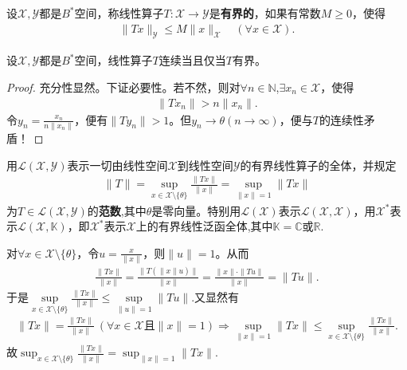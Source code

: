 \documentclass[../../main.tex]{subfiles}%
\begin{document}
\begin{definition}
设$\mathscr{X},\mathscr{Y}$都是$B^*$空间，称线性算子$T:\mathscr{X}\to\mathscr{Y}$是\textbf{有界的}，如果有常数$M\geqslant 0$，使得
\begin{align*}
\|Tx\|_{\mathscr{Y}}\leqslant M\|x\|_{\mathscr{X}}\quad (\forall x\in\mathscr{X}).
\end{align*}
\end{definition}

\begin{proposition}\label{proposition:线性算子有界当且仅当连续}
设$\mathscr{X},\mathscr{Y}$都是$B^*$空间，线性算子$T$连续当且仅当$T$有界。
\end{proposition}
\begin{proof}

充分性显然。下证必要性。若不然，则对$\forall n\in \mathbb{N}$,$\exists x_n\in\mathscr{X}$，使得
\begin{align*}
\|Tx_n\|>n\|x_n\|.
\end{align*}
令$y_n=\frac{x_n}{n\|x_n\|}$，便有$\|Ty_n\|>1$。但$y_n\to\theta(n\to\infty)$，便与$T$的连续性矛盾！

\end{proof}

\begin{definition}
用$\mathscr{L}(\mathscr{X},\mathscr{Y})$表示一切由线性空间$\mathscr{X}$到线性空间$\mathscr{Y}$的有界线性算子的全体，并规定
\begin{align*}
\|T\|=\sup_{x\in\mathscr{X}\setminus\{\theta\}}\frac{\|Tx\|}{\|x\|}=\sup_{\|x\|=1}\|Tx\|
\end{align*}
为$T\in\mathscr{L}(\mathscr{X},\mathscr{Y})$的\textbf{范数},其中$\theta$是零向量。特别用$\mathscr{L}(\mathscr{X})$表示$\mathscr{L}(\mathscr{X},\mathscr{X})$，用$\mathscr{X}^*$表示$\mathscr{L}(\mathscr{X},\mathbb{K})$，即$\mathscr{X}^*$表示$\mathscr{X}$上的有界线性泛函全体,其中$\mathbb{K}=\mathbb{C}\text{或}\mathbb{R}$.
\end{definition}
\begin{remark}
对$\forall x\in \mathscr{X} \setminus \{\theta\}$，令$u=\frac{x}{\|x\|}$，则$\|u\|=1$。从而
\begin{align*}
\frac{\|Tx\|}{\|x\|}=\frac{\|T(\|x\| u)\|}{\|x\|}=\frac{\|x\| \cdot \|Tu\|}{\|x\|}=\|Tu\|.
\end{align*}
于是$\sup\limits_{x\in \mathscr{X} \setminus \{\theta\}}\frac{\|Tx\|}{\|x\|}\leqslant \sup\limits_{\|u\|=1}\|Tu\|.$又显然有
\begin{align*}
\|Tx\|=\frac{\|Tx\|}{\|x\|}\ (\forall x\in \mathscr{X}且\|x\|=1)\Longrightarrow \sup\limits_{\|x\|=1}\|Tx\|\leqslant \sup\limits_{x\in \mathscr{X} \setminus \{\theta\}}\frac{\|Tx\|}{\|x\|}.
\end{align*}
故$\sup_{x\in\mathscr{X}\setminus\{\theta\}}\frac{\|Tx\|}{\|x\|}=\sup_{\|x\|=1}\|Tx\|.$
\end{remark}
\end{document}
